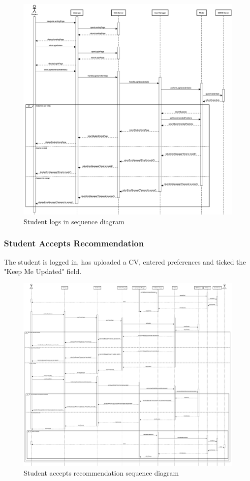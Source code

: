 \begin{figure}[h]
    \centering
    \includegraphics[width=16cm]{images/sequence-diagrams/student-logs-in.png}
    \caption{Student logs in sequence diagram}
\end{figure}

\newpage
\subsubsection{Student Accepts Recommendation}
The student is logged in, has uploaded a CV, entered preferences and ticked the "Keep Me Updated" field.

\begin{figure}[h]
    \centering
    \includegraphics[width=16cm]{images/sequence-diagrams/student-accepts-recommendation.png}
    \caption{Student accepts recommendation sequence diagram}
\end{figure}

